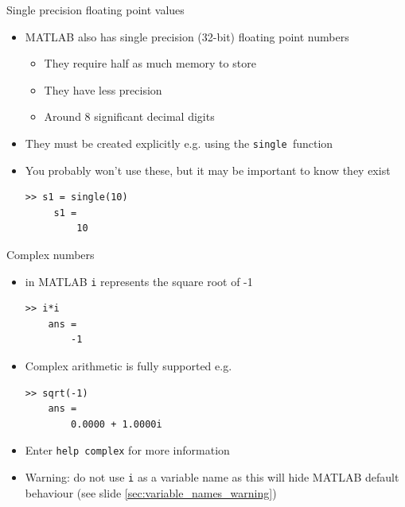 \documentclass{beamer}
\begin{document}

\begin{frame}[fragile]{Single precision floating point values}
	\begin{itemize}
		\item MATLAB also has single precision (32-bit) floating point numbers
		\begin{itemize}
			\item They require half as much memory to store
			\item They have less precision
			\item Around 8 significant decimal digits
		\end{itemize}
		\item They must be created explicitly e.g. using the \texttt{single }function
		 \item You probably won't use these, but it may be important to know they exist
		 \begin{lstlisting}[style=Matlab-editor]
	 >> s1 = single(10)
	 s1 = 
		 10
		 \end{lstlisting}
	\end{itemize}
\end{frame}

\begin{frame}[fragile]{Complex numbers}
	\begin{itemize}
		\item in MATLAB \texttt{i} represents the square root of -1
		
		\begin{lstlisting}[style=Matlab-editor]
	>> i*i
	ans = 
	    -1
		\end{lstlisting}
		\item Complex arithmetic is fully supported e.g.
		
		\begin{lstlisting}[style=Matlab-editor]
	>> sqrt(-1)
	ans = 
	    0.0000 + 1.0000i
		\end{lstlisting}
		\item Enter \texttt{help complex} for more information
		\item Warning: do not use \texttt{i} as a variable name as this will hide MATLAB default behaviour (see slide \ref{sec:variable_names_warning})
	\end{itemize}
\end{frame}
\end{document}
